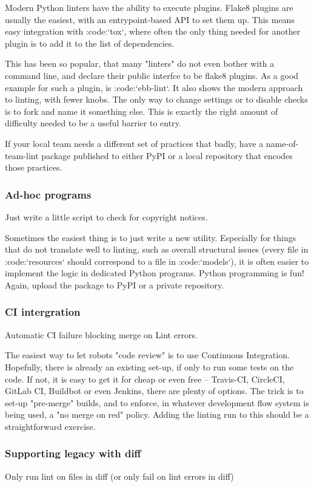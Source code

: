 Modern Python linters have the ability to execute plugins.
Flake8 plugins are usually the easiest,
with an entrypoint-based API to set them up.
This means easy integration with :code:`tox`,
where often the only thing needed for another plugin is to
add it to the list of dependencies.

This has been so popular,
that many "linters" do not even bother with
a command line,
and declare their public interfce to be flake8 plugins.
As a good example for such a plugin,
is :code:`ebb-lint`.
It also shows the modern approach to linting,
with fewer knobs.
The only way to change settings
or to disable checks is to fork
and name it something else.
This is exactly the right amount of difficulty
needed to be a useful barrier to entry.

If your local team needs a different set of practices that badly,
have a name-of-team-lint package published to either PyPI
or a local repository
that encodes those practices.

\begin{frame}
\frametitle{Ad-hoc programs}
Just write a little script to check for copyright notices.
\end{frame}

Sometimes the easiest thing is to just write a new utility.
Especially for things that do not translate well to linting,
such as overall structural issues
(every file in :code:`resources` should correspond to
a file in :code:`models`),
it is often easier to implement the logic in dedicated Python programs.
Python programming is fun!
Again, upload the package to PyPI or a private repository.

\begin{frame}
\frametitle{CI intergration}
Automatic CI failure blocking merge on Lint errors.
\end{frame}

The easiest way to let robots "code review"
is to use Continuous Integration.
Hopefully,
there is already an existing set-up,
if only to run some tests on the code.
If not,
it is easy to get it for cheap or even free --
Travis-CI, CircleCI, GitLab CI, Buildbot
or even Jenkins,
there are plenty of options.
The trick is to set-up "pre-merge"
builds,
and to enforce,
in whatever development flow system is being used,
a "no merge on red"
policy.
Adding the linting run to this should be a straightforward exercise.


\begin{frame}
\frametitle{Supporting legacy with diff}
Only run lint on files in diff
(or only fail on lint errors in diff)
\end{frame}

